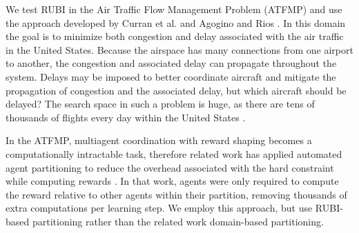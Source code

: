 \documentclass{aamas2014}
\begin{document}
We test RUBI in the Air Traffic Flow Management Problem (ATFMP) and use the approach developed by Curran et al. \cite{Curran:2013:AHC:2484920.2485183} and Agogino and Rios \cite{Agogino:2009:EEM:1570256.1570258, Rios}. In this domain the goal is to minimize both congestion and delay associated with the air traffic in the United States. Because the airspace has many connections from one airport to another, the congestion and associated delay can propagate throughout the system. Delays may be imposed to better coordinate aircraft and mitigate the propagation of congestion and the associated delay, but which aircraft should be delayed? The search space in such a problem is huge, as there are tens of thousands of flights every day within the United States \cite{faa05}.

In the ATFMP, multiagent coordination with reward shaping becomes a computationally intractable task, therefore related work has applied automated agent partitioning to reduce the overhead associated with the hard constraint while computing rewards \cite{Agogino:2009:EEM:1570256.1570258, Curran:2013:AHC:2484920.2485183, Rios}. In that work, agents were only required to compute the reward relative to other agents within their partition, removing thousands of extra computations per learning step. We employ this approach, but use RUBI-based partitioning rather than the related work domain-based partitioning.

 
\end{document}
